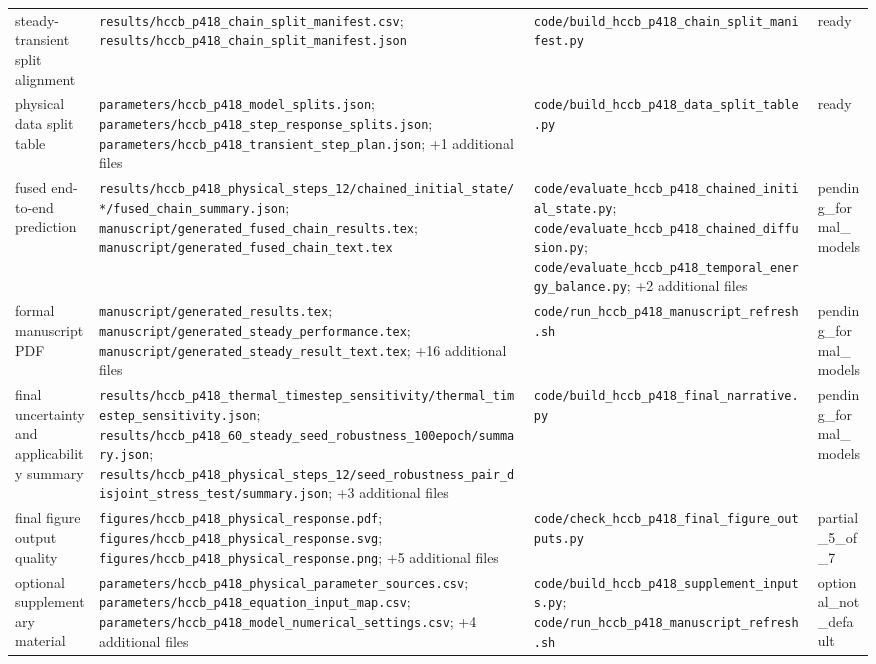 \begin{longtable}{>{\raggedright\arraybackslash}p{2.8cm}>{\raggedright\arraybackslash}p{6.6cm}>{\raggedright\arraybackslash}p{6.4cm}>{\raggedright\arraybackslash}p{2.4cm}}
steady-transient split alignment & \nolinkurl{results/hccb_p418_chain_split_manifest.csv}; \nolinkurl{results/hccb_p418_chain_split_manifest.json} & \nolinkurl{code/build_hccb_p418_chain_split_manifest.py} & ready \\
physical data split table & \nolinkurl{parameters/hccb_p418_model_splits.json}; \nolinkurl{parameters/hccb_p418_step_response_splits.json}; \nolinkurl{parameters/hccb_p418_transient_step_plan.json}; +1 additional files & \nolinkurl{code/build_hccb_p418_data_split_table.py} & ready \\
fused end-to-end prediction & \nolinkurl{results/hccb_p418_physical_steps_12/chained_initial_state/*/fused_chain_summary.json}; \nolinkurl{manuscript/generated_fused_chain_results.tex}; \nolinkurl{manuscript/generated_fused_chain_text.tex} & \nolinkurl{code/evaluate_hccb_p418_chained_initial_state.py}; \nolinkurl{code/evaluate_hccb_p418_chained_diffusion.py}; \nolinkurl{code/evaluate_hccb_p418_temporal_energy_balance.py}; +2 additional files & pending\_\allowbreak{}formal\_\allowbreak{}models \\
formal manuscript PDF & \nolinkurl{manuscript/generated_results.tex}; \nolinkurl{manuscript/generated_steady_performance.tex}; \nolinkurl{manuscript/generated_steady_result_text.tex}; +16 additional files & \nolinkurl{code/run_hccb_p418_manuscript_refresh.sh} & pending\_\allowbreak{}formal\_\allowbreak{}models \\
final uncertainty and applicability summary & \nolinkurl{results/hccb_p418_thermal_timestep_sensitivity/thermal_timestep_sensitivity.json}; \nolinkurl{results/hccb_p418_60_steady_seed_robustness_100epoch/summary.json}; \nolinkurl{results/hccb_p418_physical_steps_12/seed_robustness_pair_disjoint_stress_test/summary.json}; +3 additional files & \nolinkurl{code/build_hccb_p418_final_narrative.py} & pending\_\allowbreak{}formal\_\allowbreak{}models \\
final figure output quality & \nolinkurl{figures/hccb_p418_physical_response.pdf}; \nolinkurl{figures/hccb_p418_physical_response.svg}; \nolinkurl{figures/hccb_p418_physical_response.png}; +5 additional files & \nolinkurl{code/check_hccb_p418_final_figure_outputs.py} & partial\_\allowbreak{}5\_\allowbreak{}of\_\allowbreak{}7 \\
optional supplementary material & \nolinkurl{parameters/hccb_p418_physical_parameter_sources.csv}; \nolinkurl{parameters/hccb_p418_equation_input_map.csv}; \nolinkurl{parameters/hccb_p418_model_numerical_settings.csv}; +4 additional files & \nolinkurl{code/build_hccb_p418_supplement_inputs.py}; \nolinkurl{code/run_hccb_p418_manuscript_refresh.sh} & optional\_\allowbreak{}not\_\allowbreak{}default \\

\end{longtable}
